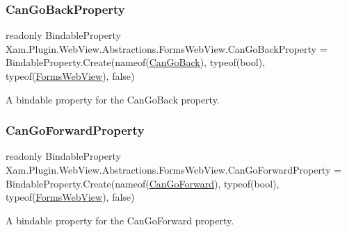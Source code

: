 \subsubsection{\texorpdfstring{Can\+Go\+Back\+Property}{CanGoBackProperty}}
{\footnotesize\ttfamily readonly Bindable\+Property Xam.\+Plugin.\+Web\+View.\+Abstractions.\+Forms\+Web\+View.\+Can\+Go\+Back\+Property = Bindable\+Property.\+Create(nameof(\hyperlink{class_xam_1_1_plugin_1_1_web_view_1_1_abstractions_1_1_forms_web_view_a59e06c36a967be7d282fad49ad08fe8b}{Can\+Go\+Back}), typeof(bool), typeof(\hyperlink{class_xam_1_1_plugin_1_1_web_view_1_1_abstractions_1_1_forms_web_view}{Forms\+Web\+View}), false)\hspace{0.3cm}{\ttfamily [static]}}



A bindable property for the Can\+Go\+Back property. 

\mbox{\label{class_xam_1_1_plugin_1_1_web_view_1_1_abstractions_1_1_forms_web_view_a28c4c26f0cbb0def7a8e25b39736dbfa}} 
\subsubsection{\texorpdfstring{Can\+Go\+Forward\+Property}{CanGoForwardProperty}}
{\footnotesize\ttfamily readonly Bindable\+Property Xam.\+Plugin.\+Web\+View.\+Abstractions.\+Forms\+Web\+View.\+Can\+Go\+Forward\+Property = Bindable\+Property.\+Create(nameof(\hyperlink{class_xam_1_1_plugin_1_1_web_view_1_1_abstractions_1_1_forms_web_view_aa311b0f3eff14d5edc8e37f42175168e}{Can\+Go\+Forward}), typeof(bool), typeof(\hyperlink{class_xam_1_1_plugin_1_1_web_view_1_1_abstractions_1_1_forms_web_view}{Forms\+Web\+View}), false)\hspace{0.3cm}{\ttfamily [static]}}



A bindable property for the Can\+Go\+Forward property. 

\mbox{\label{class_xam_1_1_plugin_1_1_web_view_1_1_abstractions_1_1_forms_web_view_a96ddcfe6c508d10563ec47269ca77970}} 
